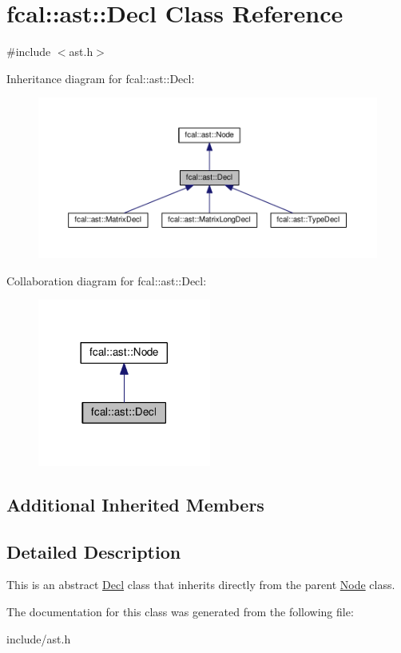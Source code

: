 \hypertarget{classfcal_1_1ast_1_1Decl}{}\section{fcal\+:\+:ast\+:\+:Decl Class Reference}
\label{classfcal_1_1ast_1_1Decl}


{\ttfamily \#include $<$ast.\+h$>$}



Inheritance diagram for fcal\+:\+:ast\+:\+:Decl\+:\nopagebreak
\begin{figure}[H]
\begin{center}
\leavevmode
\includegraphics[width=350pt]{classfcal_1_1ast_1_1Decl__inherit__graph}
\end{center}
\end{figure}


Collaboration diagram for fcal\+:\+:ast\+:\+:Decl\+:\nopagebreak
\begin{figure}[H]
\begin{center}
\leavevmode
\includegraphics[width=161pt]{classfcal_1_1ast_1_1Decl__coll__graph}
\end{center}
\end{figure}
\subsection*{Additional Inherited Members}


\subsection{Detailed Description}
This is an abstract \hyperlink{classfcal_1_1ast_1_1Decl}{Decl} class that inherits directly from the parent \hyperlink{classfcal_1_1ast_1_1Node}{Node} class. 

The documentation for this class was generated from the following file\+:\begin{DoxyCompactItemize}
\item 
include/ast.\+h\end{DoxyCompactItemize}
